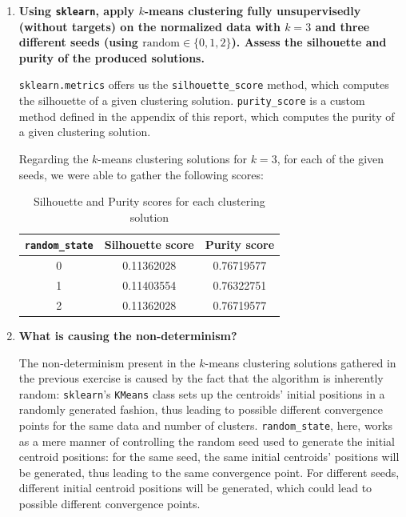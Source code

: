 \documentclass[12pt]{article}
\begin{document}
\begin{enumerate}[leftmargin=\labelsep,resume]

  \item \textbf{Using \texttt{sklearn}, apply $k$-means clustering fully unsupervisedly
          (without targets) on the normalized data with $k = 3$ and three different seeds
          (using $\text{random} \in \{0, 1, 2\}$). Assess the silhouette and purity of the produced solutions.}

        \texttt{sklearn.metrics} offers us the \texttt{silhouette\_score} method, which
        computes the silhouette of a given clustering solution.
        \texttt{purity\_score} is a custom method defined in the appendix of this report,
        which computes the purity of a given clustering solution.

        Regarding the $k$-means clustering solutions for $k = 3$, for each of the
        given seeds, we were able to gather the following scores:

        \begin{table}[H]
          \centering
          \begin{tabular}{c|c|c}
            \textbf{\texttt{random\_state}} & \textbf{Silhouette score} & \textbf{Purity score} \\ \hline
            0                               & 0.11362028                & 0.76719577            \\
            1                               & 0.11403554                & 0.76322751            \\
            2                               & 0.11362028                & 0.76719577            \\
          \end{tabular}
          \caption{Silhouette and Purity scores for each clustering solution}
          \label{tab:clustering-solutions-scores}
        \end{table}


  \item \textbf{What is causing the non-determinism?}

        The non-determinism present in the $k$-means clustering solutions gathered
        in the previous exercise is caused by the fact that the algorithm is
        inherently random: \texttt{sklearn}'s \texttt{KMeans} class sets up
        the centroids' initial positions in a randomly generated fashion,
        thus leading to possible different convergence points for the same
        data and number of clusters. \texttt{random\_state}, here, works
        as a mere manner of controlling the random seed used to generate
        the initial centroid positions: for the same seed, the same
        initial centroids' positions will be generated, thus leading to
        the same convergence point. For different seeds, different
        initial centroid positions will be generated, which could lead
        to possible different convergence points.


\end{enumerate}
\end{document}
